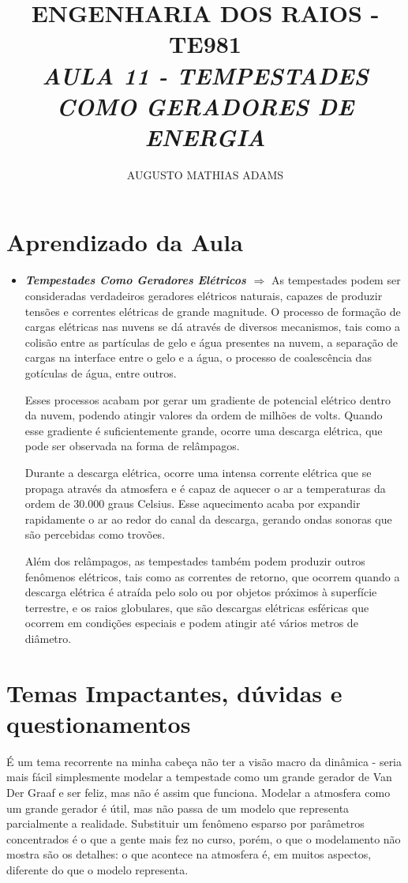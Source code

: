 \documentclass[a4paper, 12pt, onecolumn,singlespacing]{article}
\title{\normalsize{ENGENHARIA DOS RAIOS - TE981}\\ \huge{\textbf\textit{{AULA 11 - TEMPESTADES COMO GERADORES DE ENERGIA}}\\}}
\author{\small{AUGUSTO MATHIAS ADAMS}}
\begin{document}
	
	\maketitle
	
	\section{Aprendizado da Aula}
	
	\begin{itemize}
		
		\item \textbf{\textit{Tempestades Como Geradores Elétricos $\Rightarrow$ }}As tempestades podem ser consideradas verdadeiros geradores elétricos naturais, capazes de produzir tensões e correntes elétricas de grande magnitude. O processo de formação de cargas elétricas nas nuvens se dá através de diversos mecanismos, tais como a colisão entre as partículas de gelo e água presentes na nuvem, a separação de cargas na interface entre o gelo e a água, o processo de coalescência das gotículas de água, entre outros.
		
		Esses processos acabam por gerar um gradiente de potencial elétrico dentro da nuvem, podendo atingir valores da ordem de milhões de volts. Quando esse gradiente é suficientemente grande, ocorre uma descarga elétrica, que pode ser observada na forma de relâmpagos.
		
		Durante a descarga elétrica, ocorre uma intensa corrente elétrica que se propaga através da atmosfera e é capaz de aquecer o ar a temperaturas da ordem de 30.000 graus Celsius. Esse aquecimento acaba por expandir rapidamente o ar ao redor do canal da descarga, gerando ondas sonoras que são percebidas como trovões.
		
		Além dos relâmpagos, as tempestades também podem produzir outros fenômenos elétricos, tais como as correntes de retorno, que ocorrem quando a descarga elétrica é atraída pelo solo ou por objetos próximos à superfície terrestre, e os raios globulares, que são descargas elétricas esféricas que ocorrem em condições especiais e podem atingir até vários metros de diâmetro.
	
	\end{itemize}
	
	\section{Temas Impactantes, dúvidas e questionamentos}
	
	É um tema recorrente na minha cabeça não ter a visão macro da dinâmica - seria mais fácil simplesmente modelar a tempestade como um grande gerador de Van Der Graaf e ser feliz, mas não é assim que funciona. Modelar a atmosfera como um grande gerador é útil, mas não passa de um modelo que representa parcialmente a realidade. Substituir um fenômeno esparso por parâmetros concentrados é o que a gente mais fez no curso, porém, o que o modelamento não mostra são os detalhes: o que acontece na atmosfera é, em muitos aspectos, diferente do que o modelo representa.
\end{document}
